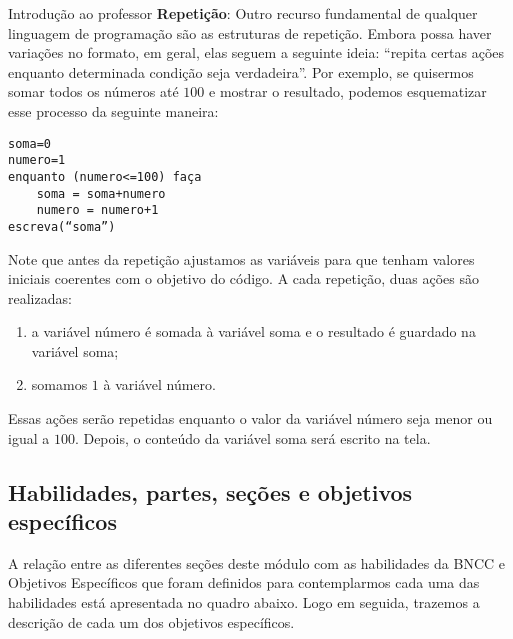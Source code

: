 \begin{apresentacao}{Introdução ao professor}
\textbf{Repetição}: Outro recurso fundamental de qualquer linguagem de programação são as estruturas de repetição. Embora possa haver variações no formato, em geral, elas seguem a seguinte ideia: “repita certas ações enquanto determinada condição seja verdadeira”. Por exemplo, se quisermos somar todos os números até $100$ e mostrar o resultado, podemos esquematizar esse processo da seguinte maneira:

\newpage
\begin{verbatim}
soma=0
numero=1
enquanto (numero<=100) faça
    soma = soma+numero
    numero = numero+1	
escreva(“soma”)
\end{verbatim}

Note que antes da repetição ajustamos as variáveis para que tenham valores iniciais coerentes com o objetivo do código. A cada repetição, duas ações são realizadas: 
\begin{enumerate}
\item a variável número é somada à variável soma e o resultado é guardado na variável soma; 
\item somamos $1$ à variável número.
\end{enumerate}

Essas ações serão repetidas enquanto o valor da variável número seja menor ou igual a $100$. Depois, o conteúdo da variável soma será escrito na tela.

\subsection{Habilidades, partes, seções e objetivos específicos}

A relação entre as diferentes seções deste módulo com as habilidades da BNCC e Objetivos Específicos que foram definidos para contemplarmos cada uma das habilidades está apresentada no quadro abaixo. Logo em seguida, trazemos a descrição de cada um dos objetivos específicos.

\begin{table}[H]
\centering


\end{table}
\end{apresentacao}
